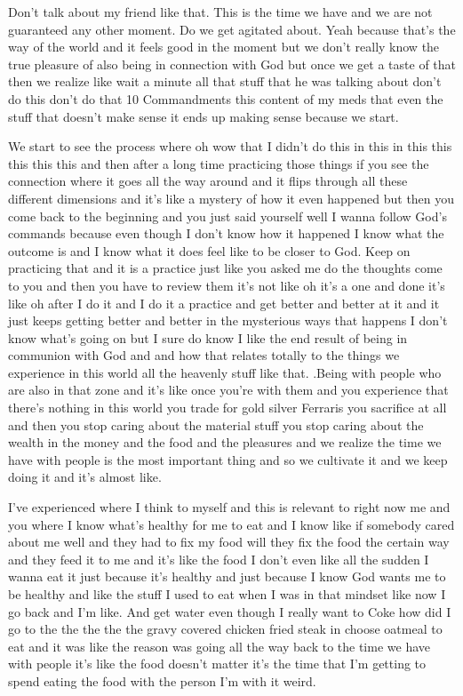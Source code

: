 \documentclass{article}
\begin{document}
\begin{multicols}{3}
\closearticle


Don't talk about my friend like that. This is the time we have and we are not guaranteed any other moment. Do we get agitated about. Yeah because that's the way of the world and it feels good in the moment but we don't really know the true pleasure of also being in connection with God but once we get a taste of that then we realize like wait a minute all that stuff that he was talking about don't do this don't do that 10 Commandments this content of my meds that even the stuff that doesn't make sense it ends up making sense because we start.  

We start to see the process where oh wow that I didn't do this in this in this this this this this and then after a long time practicing those things if you see the connection where it goes all the way around and it flips through all these different dimensions and it's like a mystery of how it even happened but then you come back to the beginning and you just said yourself well I wanna follow God's commands because even though I don't know how it happened I know what the outcome is and I know what it does feel like to be closer to God. Keep on practicing that and it is a practice just like you asked me do the thoughts come to you and then you have to review them it's not like oh it's a one and done it's like oh after I do it and I do it a practice and get better and better at it and it just keeps getting better and better in the mysterious ways that happens I don't know what's going on but I sure do know I like the end result of being in communion with God and and how that relates totally to the things we experience in this world all the heavenly stuff like that. .Being with people who are also in that zone and it's like once you're with them and you experience that there's nothing in this world you trade for gold silver Ferraris you sacrifice at all and then you stop caring about the material stuff you stop caring about the wealth in the money and the food and the pleasures and we realize the time we have with people is the most important thing and so we cultivate it and we keep doing it and it's almost like.  

I've experienced where I think to myself and this is relevant to right now me and you where I know what's healthy for me to eat and I know like if somebody cared about me well and they had to fix my food will they fix the food the certain way and they feed it to me and it's like the food I don't even like all the sudden I wanna eat it just because it's healthy and just because I know God wants me to be healthy and like the stuff I used to eat when I was in that mindset like now I go back and I'm like.  And get water even though I really want to Coke how did I go to the the the the the gravy covered chicken fried steak in choose oatmeal to eat and it was like the reason was going all the way back to the time we have with people it's like the food doesn't matter it's the time that I'm getting to spend eating the food with the person I'm with it weird.  


\end{multicols}
\end{document}
